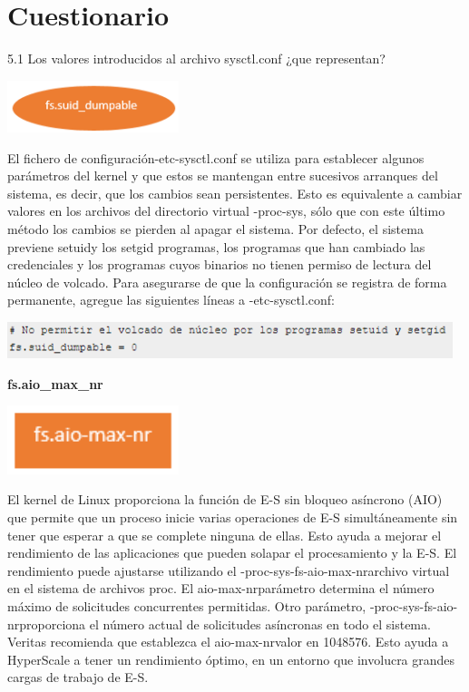 \section{Cuestionario} 
\vspace{\baselineskip}
5.1 Los valores introducidos al archivo sysctl.conf ¿que representan?

\begin{center}
		\includegraphics[width=5cm]{./Imagenes/1-C} 
	\end{center} 

\vspace{\baselineskip}

El fichero de configuración-etc-sysctl.conf se utiliza para establecer algunos parámetros del kernel y que estos se mantengan  entre sucesivos arranques del sistema, es decir, que los cambios sean persistentes. Esto es equivalente a cambiar valores en los archivos del directorio virtual -proc-sys, sólo que con este último método los cambios se pierden al apagar el sistema.
Por defecto, el sistema previene setuidy los setgid programas, los programas que han cambiado las credenciales y los programas cuyos binarios no tienen permiso de lectura del núcleo de volcado. Para asegurarse de que la configuración se registra de forma permanente, agregue las siguientes líneas a -etc-sysctl.conf:

\begin{center}
		\includegraphics[width=13cm]{./Imagenes/2-C} 
	\end{center} 

{\bfseries fs.aio\_max\_nr}

\begin{center}
		\includegraphics[width=5cm]{./Imagenes/3-C} 
	\end{center} 

 El kernel de Linux proporciona la función de E-S sin bloqueo asíncrono (AIO) que permite que un proceso inicie varias operaciones de E-S simultáneamente sin tener que esperar a que se complete ninguna de ellas. Esto ayuda a mejorar el rendimiento de las  aplicaciones que pueden solapar el procesamiento y la E-S.
El rendimiento puede ajustarse utilizando el -proc-sys-fs-aio-max-nrarchivo virtual en el sistema de archivos proc. El aio-max-nrparámetro determina el número máximo de solicitudes concurrentes permitidas.
Otro parámetro, -proc-sys-fs-aio-nrproporciona el número actual de solicitudes asíncronas en todo el sistema.
Veritas recomienda que establezca el aio-max-nrvalor en 1048576. Esto ayuda a HyperScale a tener un rendimiento óptimo, en un entorno que involucra grandes cargas de trabajo de E-S.

